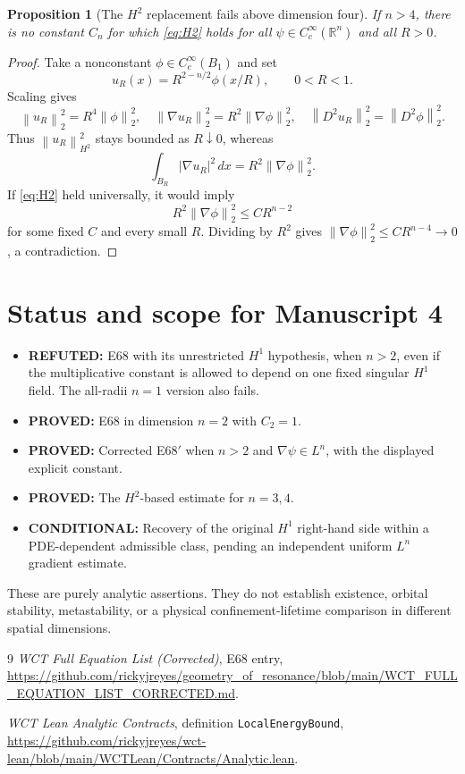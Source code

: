 \documentclass[11pt]{article}
\newtheorem{proposition}[theorem]{Proposition}
\newcommand{\Rn}{\mathbb{R}^{n}}
\newcommand{\norm}[1]{\left\lVert #1\right\rVert}
\begin{document}
\begin{proposition}[The $H^2$ replacement fails above dimension four]
\label{prop:H2fail}
If $n>4$, there is no constant $C_n$ for which
\eqref{eq:H2} holds for all $\psi\in C_c^\infty(\Rn)$ and all $R>0$.
\end{proposition}

\begin{proof}
Take a nonconstant $\phi\in C_c^\infty(B_1)$ and set
\[
u_R(x)=R^{2-n/2}\phi(x/R),\qquad 0<R<1.
\]
Scaling gives
\[
\norm{u_R}_2^2=R^4\norm{\phi}_2^2,
\quad \norm{\nabla u_R}_2^2=R^2\norm{\nabla\phi}_2^2,
\quad \norm{D^2u_R}_2^2=\norm{D^2\phi}_2^2.
\]
Thus $\norm{u_R}_{H^2}^2$ stays bounded as $R\downarrow0$, whereas
\[
\int_{B_R}|\nabla u_R|^2\,dx
=R^2\norm{\nabla\phi}_2^2.
\]
If \eqref{eq:H2} held universally, it would imply
\[
R^2\norm{\nabla\phi}_2^2\leq C R^{n-2}
\]
for some fixed $C$ and every small $R$. Dividing by $R^2$ gives
$\norm{\nabla\phi}_2^2\leq C R^{n-4}\to0$, a contradiction.
\end{proof}

\section{Status and scope for Manuscript 4}

\begin{itemize}
\item \textbf{REFUTED:} E68 with its unrestricted $H^1$ hypothesis,
when $n>2$, even if the multiplicative constant is allowed to depend on
one fixed singular $H^1$ field. The all-radii $n=1$ version also fails.
\item \textbf{PROVED:} E68 in dimension $n=2$ with $C_2=1$.
\item \textbf{PROVED:} Corrected E68$'$ when $n>2$ and
$\nabla\psi\in L^n$, with the displayed explicit constant.
\item \textbf{PROVED:} The $H^2$-based estimate for $n=3,4$.
\item \textbf{CONDITIONAL:} Recovery of the original $H^1$ right-hand
side within a PDE-dependent admissible class, pending an independent
uniform $L^n$ gradient estimate.
\end{itemize}

These are purely analytic assertions. They do not establish existence,
orbital stability, metastability, or a physical confinement-lifetime
comparison in different spatial dimensions.

\begin{thebibliography}{9}
\emph{WCT Full Equation List (Corrected)}, E68 entry,
\url{https://github.com/rickyjreyes/geometry_of_resonance/blob/main/WCT_FULL_EQUATION_LIST_CORRECTED.md}.

\emph{WCT Lean Analytic Contracts}, definition \texttt{LocalEnergyBound},
\url{https://github.com/rickyjreyes/wct-lean/blob/main/WCTLean/Contracts/Analytic.lean}.
\end{thebibliography}
\end{document}
